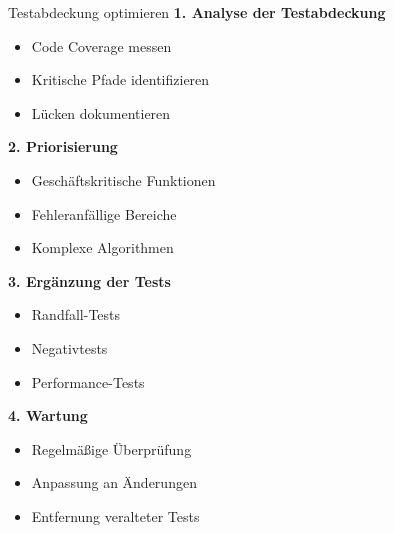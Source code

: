 \begin{KR}{Testabdeckung optimieren}
\textbf{1. Analyse der Testabdeckung}
\begin{itemize}
    \item Code Coverage messen
    \item Kritische Pfade identifizieren
    \item Lücken dokumentieren
\end{itemize}

\textbf{2. Priorisierung}
\begin{itemize}
    \item Geschäftskritische Funktionen
    \item Fehleranfällige Bereiche
    \item Komplexe Algorithmen
\end{itemize}

\textbf{3. Ergänzung der Tests}
\begin{itemize}
    \item Randfall-Tests
    \item Negativtests
    \item Performance-Tests
\end{itemize}

\textbf{4. Wartung}
\begin{itemize}
    \item Regelmäßige Überprüfung
    \item Anpassung an Änderungen
    \item Entfernung veralteter Tests
\end{itemize}
\end{KR}

